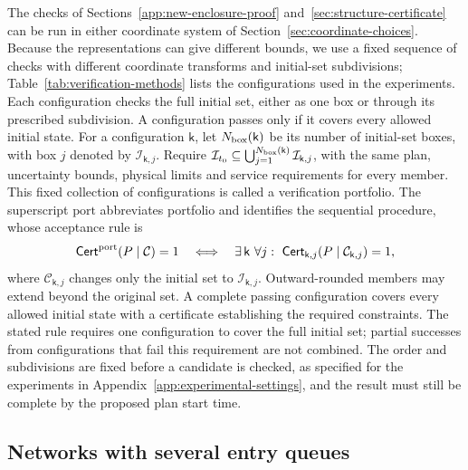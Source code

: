 \documentclass[final]{cas-sc}
\theoremstyle{definition}
\theoremstyle{plain}
\theoremstyle{definition}
\theoremstyle{plain}
\newcommand{\appref}[1]{Appendix~\ref{#1}}
\begin{document}
The checks of Sections~\ref{app:new-enclosure-proof}
and~\ref{sec:structure-certificate} can be run in either coordinate system of
Section~\ref{sec:coordinate-choices}. Because the representations can give
different bounds, we use a fixed sequence of checks with different
coordinate transforms and initial-set subdivisions;
Table~\ref{tab:verification-methods} lists the configurations used in the
experiments. Each configuration checks the full initial set, either as
one box or through its prescribed subdivision. A configuration passes
only if it covers every allowed initial state. For a configuration
$\mathsf k$, let $N_{\rm box}(\mathsf k)$ be its number of initial-set
boxes, with box $j$ denoted by $\mathcal I_{\mathsf k,j}$. Require
$\mathcal I_{t_0}\subseteq
\bigcup_{j=1}^{N_{\rm box}(\mathsf k)}\mathcal I_{\mathsf k,j}$,
with the same plan, uncertainty bounds, physical limits and service
requirements for every member. This fixed collection of configurations
is called a verification portfolio. The superscript $\mathrm{port}$
abbreviates portfolio and identifies the sequential procedure, whose
acceptance rule is
\begin{equation}
\mathsf{Cert}^{\rm port}(P\mid\mathcal C)=1
\quad\Longleftrightarrow\quad
\exists\,\mathsf k\ \forall j:\
\mathsf{Cert}_{\mathsf k,j}(P\mid\mathcal C_{\mathsf k,j})=1,
\label{eq:portfolio-cover-rule}
\end{equation}
where $\mathcal C_{\mathsf k,j}$ changes only the initial set to
$\mathcal I_{\mathsf k,j}$. Outward-rounded members may extend beyond
the original set. A complete passing configuration covers every allowed
initial state with a certificate establishing the required constraints.
The stated rule requires one configuration to cover the full initial
set; partial successes from configurations that fail this requirement
are not combined. The order and subdivisions are fixed before a
candidate is checked, as specified for the experiments in
\appref{app:experimental-settings}, and the result must still be complete by the
proposed plan start time.

\subsection{Networks with several entry queues}
\label{sec:network-extension}
\end{document}

